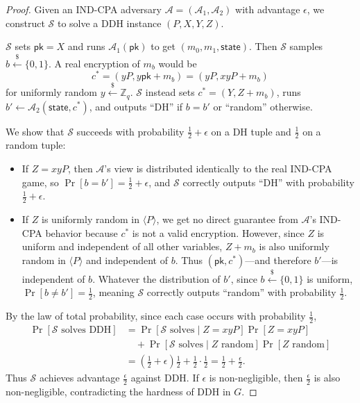 \begin{proof}
    Given an IND-CPA adversary \(\mathcal{A} = (\mathcal{A}_1, \mathcal{A}_2)\) with advantage \(\epsilon\), we construct \(\mathcal{S}\) to solve a DDH instance \((P, X, Y, Z)\).

    \(\mathcal{S}\) sets \(\mathsf{pk} = X\) and runs \(\mathcal{A}_1(\mathsf{pk})\) to get \((m_0, m_1, \mathsf{state})\).
    Then \(\mathcal{S}\) samples \(b \xleftarrow{\$} \{0, 1\}\).
    A real encryption of \(m_b\) would be
    \[
        c^* = (yP, y\mathsf{pk} + m_b) = (yP, xyP + m_b)
    \]
    for uniformly random \(y \xleftarrow{\$} \mathbb{Z}_q\).
    \(\mathcal{S}\) instead sets \(c^* = (Y, Z + m_b)\), runs \(b' \gets \mathcal{A}_2(\mathsf{state}, c^*)\), and outputs ``DH'' if \(b = b'\) or ``random'' otherwise.

    We show that \(\mathcal{S}\) succeeds with probability \(\frac{1}{2} + \epsilon\) on a DH tuple and \(\frac{1}{2}\) on a random tuple:
    \begin{itemize}
        \item If \(Z = xyP\), then \(\mathcal{A}\)'s view is distributed identically to the real IND-CPA game, so \(\Pr[b = b'] = \frac{1}{2} + \epsilon\), and \(\mathcal{S}\) correctly outputs ``DH'' with probability \(\frac{1}{2} + \epsilon\).
        \item If \(Z\) is uniformly random in \(\langle P \rangle\), we get no direct guarantee from \(\mathcal{A}\)'s IND-CPA behavior because \(c^*\) is not a valid encryption. However, since \(Z\) is uniform and independent of all other variables, \(Z + m_b\) is also uniformly random in \(\langle P \rangle\) and independent of \(b\). Thus \((\mathsf{pk}, c^*)\)---and therefore \(b'\)---is independent of \(b\). Whatever the distribution of \(b'\), since \(b \xleftarrow{\$} \{0, 1\}\) is uniform, \(\Pr[b \neq b'] = \frac{1}{2}\), meaning \(\mathcal{S}\) correctly outputs ``random'' with probability \(\frac{1}{2}\).
    \end{itemize}
    By the law of total probability, since each case occurs with probability \(\frac{1}{2}\),
    \begin{align*}
        \Pr[\mathcal{S} \text{ solves DDH}]
        &= \Pr[\mathcal{S} \text{ solves} \mid Z = xyP]\Pr[Z = xyP] \\
        &\quad + \Pr[\mathcal{S} \text{ solves} \mid Z \text{ random}]\Pr[Z \text{ random}] \\
        &= \left(\frac{1}{2} + \epsilon\right)\frac{1}{2} + \frac{1}{2}\cdot\frac{1}{2}
        = \frac{1}{2} + \frac{\epsilon}{2}.
    \end{align*}
    Thus \(\mathcal{S}\) achieves advantage \(\frac{\epsilon}{2}\) against DDH. If \(\epsilon\) is non-negligible, then \(\frac{\epsilon}{2}\) is also non-negligible, contradicting the hardness of DDH in \(G\).
\end{proof}

